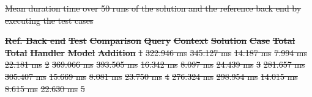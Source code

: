 \documentclass[draft,final]{vutinfth} %
\providecommand{\DIFdeltex}[1]{{\protect\color{red}\sout{#1}}}                      %
\providecommand{\DIFdelFL}[1]{\DIFdel{#1}} %
\providecommand{\DIFdel}[1]{\texorpdfstring{\DIFdeltex{#1}}{}} %
\begin{document}
{%
\DIFdelFL{Mean duration time over 50 runs of the solution and the reference back end by executing the test cases}}

\textbf{} %
\textbf{\DIFdelFL{Ref. Back end}} %
\textbf{\DIFdelFL{Test}} %
\textbf{} %
\textbf{\DIFdelFL{Comparison}} %
\textbf{\DIFdelFL{Query}} %
\textbf{\DIFdelFL{Context}} %
\textbf{\DIFdelFL{Solution}} %
\textbf{\DIFdelFL{Case}} %
\textbf{\DIFdelFL{Total}} %
\textbf{\DIFdelFL{Total}} %
\textbf{\DIFdelFL{Handler}} %
\textbf{\DIFdelFL{Model}} %
\textbf{\DIFdelFL{Addition}} %
\DIFdelFL{1 }%
\DIFdelFL{322.946 ms }%
\DIFdelFL{345.127 ms }%
\DIFdelFL{14.187 ms }%
\DIFdelFL{7.994 ms }%
\DIFdelFL{22.181 ms }%
\DIFdelFL{2 }%
\DIFdelFL{369.066 ms }%
\DIFdelFL{393.505 ms }%
\DIFdelFL{16.342 ms }%
\DIFdelFL{8.097 ms }%
\DIFdelFL{24.439 ms }%
\DIFdelFL{3 }%
\DIFdelFL{281.657 ms }%
\DIFdelFL{305.407 ms }%
\DIFdelFL{15.669 ms }%
\DIFdelFL{8.081 ms }%
\DIFdelFL{23.750 ms }%
\DIFdelFL{4 }%
\DIFdelFL{276.324 ms }%
\DIFdelFL{298.954 ms }%
\DIFdelFL{14.015 ms }%
\DIFdelFL{8.615 ms }%
\DIFdelFL{22.630 ms }%
\DIFdelFL{5 }%
\end{document}
